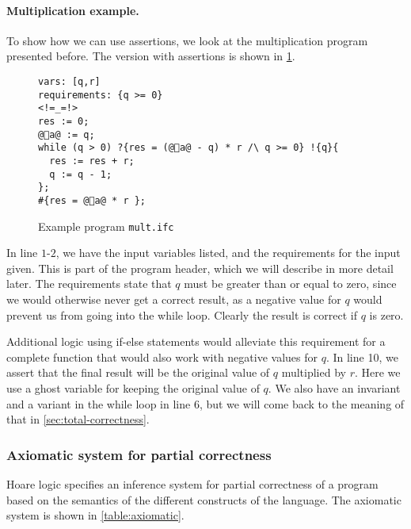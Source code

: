 \paragraph{Multiplication example.}
To show how we can use assertions, we look at the multiplication program presented before. The version with assertions is shown in \cref{figure:mult}.
\begin{figure}
  \begin{lstlisting}[escapechar=@]
vars: [q,r]
requirements: {q >= 0}
<!=_=!>
res := 0;
@👻a@ := q;
while (q > 0) ?{res = (@👻a@ - q) * r /\ q >= 0} !{q}{
  res := res + r;
  q := q - 1;
};
#{res = @👻a@ * r };
\end{lstlisting}
% 
\caption{Example program \texttt{mult.ifc}}
\label{figure:mult}
\end{figure}

In line $1$-$2$, we have the input variables listed, and the requirements for the input given.
This is part of the program header, which we will describe in more detail later.
The requirements state that $q$ must be greater than or equal to zero, since we would otherwise never get a correct result, as a negative value for $q$ would prevent us from going into the while loop. 
Clearly the result is correct if $q$ is zero.

Additional logic using if-else statements would alleviate this requirement for a complete function that would also work with negative values for $q$.
In line 10, we assert that the final result will be the original value of $q$ multiplied by $r$.
Here we use a ghost variable for keeping the original value of $q$.
We also have an invariant and a variant in the while loop in line 6, but we will come back to the meaning of that in \cref{sec:total-correctness}.


\subsubsection{Axiomatic system for partial correctness}
Hoare logic specifies an inference system for partial correctness of a program based on the semantics of the different constructs of the language. The axiomatic system is shown in \cref{table:axiomatic}.

